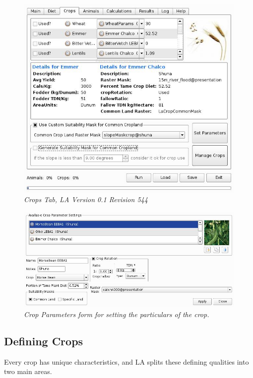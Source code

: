 \begin{figure}[htbp]
    \includegraphics[scale=.366]{./images/LanduseAnalystCrops546.jpg}
    \caption{\label{fig:crop}\textit{Crops Tab, LA Version 0.1 Revision 544}}
\end{figure}

\begin{figure}[htbp] %
  \includegraphics[scale=.28]{./images/cropParameters.jpg}
  \caption[Crop Parameters]{\label{fig:cropParameters}\textit{Crop
    Parameters form for setting the particulars of the crop.}}
\end{figure}

  \subsection{Defining Crops}Every crop has unique
  characteristics, and LA splits these defining qualities into two
  main areas.
